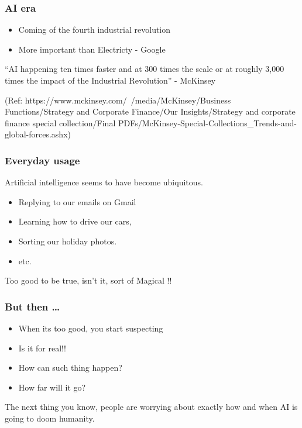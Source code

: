 \begin{frame}[fragile]\frametitle{AI era}
\begin{itemize}
\item Coming of the fourth industrial revolution
\item More important than Electricty - Google
\end{itemize}

``AI happening ten times faster and at 300 times the scale or at roughly 3,000 times the impact of the Industrial Revolution'' - McKinsey

{\tiny (Ref: https://www.mckinsey.com/~/media/McKinsey/Business Functions/Strategy and Corporate Finance/Our Insights/Strategy and corporate finance special collection/Final PDFs/McKinsey-Special-Collections\_Trends-and-global-forces.ashx)}
\end{frame}



\begin{frame}[fragile]\frametitle{Everyday usage}
Artificial intelligence seems to have become ubiquitous.
\begin{itemize}
\item Replying to our emails on Gmail
\item Learning how to drive our cars,
\item Sorting our holiday photos.
\item etc.
\end{itemize}
Too good to be true, isn't it, sort of Magical !!
\end{frame}

\begin{frame}[fragile]\frametitle{But then \ldots}
\begin{itemize}
\item When its too good, you start suspecting
\item Is it for real!!
\item How can such thing happen?
\item How far will it go?
\end{itemize}
The next thing you know, people are worrying about exactly how and when AI is going to doom humanity.
\end{frame}

